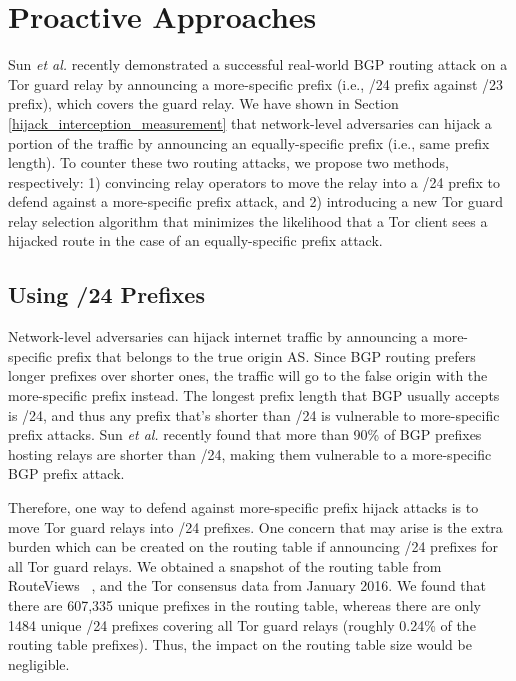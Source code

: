 \section{Proactive Approaches}
\label{sec:proactive}
Sun \emph{et al.} \cite{sun2015raptor} recently demonstrated a successful real-world BGP routing attack on a Tor guard relay by announcing a more-specific prefix (i.e., /24 prefix against /23 prefix), which covers the guard relay. We have shown in Section \ref{hijack_interception_measurement} that network-level adversaries can hijack a portion of the traffic by announcing an equally-specific prefix (i.e., same prefix length). To counter these two routing attacks, we propose two methods, respectively: 1) convincing relay operators to move the relay into a /24 prefix to defend against a more-specific prefix attack, and 2) introducing a new Tor guard relay selection algorithm that minimizes the likelihood that a Tor client sees a hijacked route in the case of an equally-specific prefix attack.

\subsection{Using /24 Prefixes}
\label{subsec:24prefix}
Network-level adversaries can hijack internet traffic by announcing a more-specific prefix that belongs to the true origin AS. Since BGP routing prefers longer prefixes over shorter ones, the traffic will go to the false origin with the more-specific prefix instead. The longest prefix length that BGP usually accepts is /24, and thus any prefix that's shorter than /24 is vulnerable to more-specific prefix attacks. Sun \emph{et al.} \cite{sun2015raptor} recently found that more than 90\% of BGP prefixes hosting relays are
shorter than /24, making them vulnerable to a more-specific BGP prefix attack. 



Therefore, one way to defend against more-specific prefix hijack attacks is to move Tor guard relays into /24 prefixes. One concern that may arise is the extra burden which can be created on the routing table if announcing /24 prefixes for all Tor guard relays. We obtained a snapshot of the routing table from RouteViews ~\cite{routeviews}, and the Tor consensus data from January 2016. We found that there are 607,335 unique prefixes in the routing table, whereas there are only 1484 unique /24 prefixes covering all Tor guard relays (roughly 0.24\% of the routing table prefixes). Thus, the impact on the routing table size would be negligible. 

